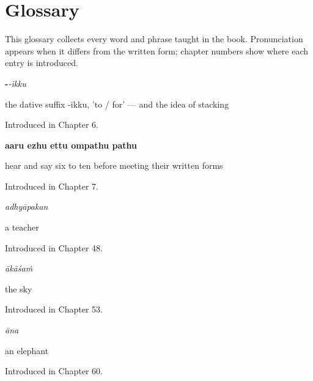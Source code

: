 
\chapter*{Glossary}

This glossary collects every word and phrase taught in the book. Pronunciation appears when it differs from the written form; chapter numbers show where each entry is introduced.

\noindent\begin{minipage}[t]{\linewidth}
\raggedright
\textbf{-}\enspace\emph{-ikku}\par
\small the dative suffix -ikku, 'to / for' — and the idea of stacking\par
\footnotesize Introduced in Chapter 6.
\end{minipage}\par\medskip

\noindent\begin{minipage}[t]{\linewidth}
\raggedright
\textbf{aaru ezhu ettu ompathu pathu}\par
\small hear and say six to ten before meeting their written forms\par
\footnotesize Introduced in Chapter 7.
\end{minipage}\par\medskip

\noindent\begin{minipage}[t]{\linewidth}
\raggedright
\textbf{}\enspace\emph{adhyāpakan}\par
\small a teacher\par
\footnotesize Introduced in Chapter 48.
\end{minipage}\par\medskip

\noindent\begin{minipage}[t]{\linewidth}
\raggedright
\textbf{}\enspace\emph{ākāśaṁ}\par
\small the sky\par
\footnotesize Introduced in Chapter 53.
\end{minipage}\par\medskip

\noindent\begin{minipage}[t]{\linewidth}
\raggedright
\textbf{}\enspace\emph{āna}\par
\small an elephant\par
\footnotesize Introduced in Chapter 60.
\end{minipage}\par\medskip

